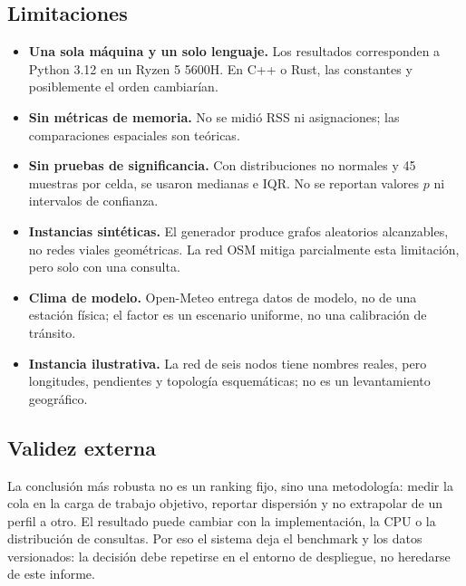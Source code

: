 \subsection{Limitaciones}
\begin{itemize}
    \item \textbf{Una sola máquina y un solo lenguaje.} Los resultados corresponden a Python 3.12 en un Ryzen 5 5600H. En C++ o Rust, las constantes y posiblemente el orden cambiarían.
    \item \textbf{Sin métricas de memoria.} No se midió RSS ni asignaciones; las comparaciones espaciales son teóricas.
    \item \textbf{Sin pruebas de significancia.} Con distribuciones no normales y 45 muestras por celda, se usaron medianas e IQR. No se reportan valores $p$ ni intervalos de confianza.
    \item \textbf{Instancias sintéticas.} El generador produce grafos aleatorios alcanzables, no redes viales geométricas. La red OSM mitiga parcialmente esta limitación, pero solo con una consulta.
    \item \textbf{Clima de modelo.} Open-Meteo entrega datos de modelo, no de una estación física; el factor es un escenario uniforme, no una calibración de tránsito.
    \item \textbf{Instancia ilustrativa.} La red de seis nodos tiene nombres reales, pero longitudes, pendientes y topología esquemáticas; no es un levantamiento geográfico.
\end{itemize}

\subsection{Validez externa}
La conclusión más robusta no es un ranking fijo, sino una metodología: medir la cola en la carga de trabajo objetivo, reportar dispersión y no extrapolar de un perfil a otro. El resultado puede cambiar con la implementación, la CPU o la distribución de consultas. Por eso el sistema deja el benchmark y los datos versionados: la decisión debe repetirse en el entorno de despliegue, no heredarse de este informe.
